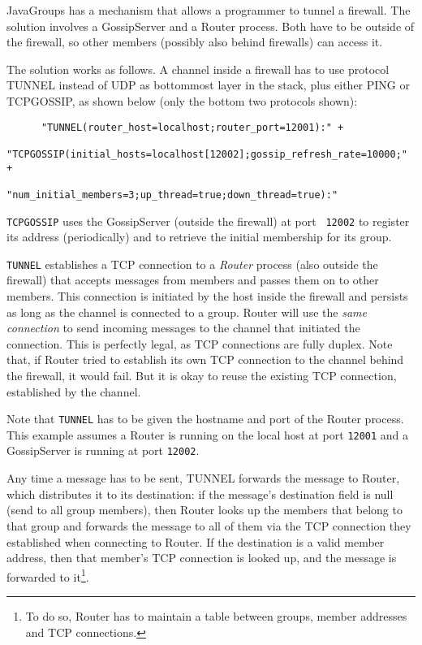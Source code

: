       JavaGroups has a mechanism that allows a programmer to tunnel a firewall. The
      solution involves a GossipServer and a Router process. Both have to be outside
      of the firewall, so other members (possibly also behind firewalls) can access
      it.

      The solution works as follows. A channel inside a firewall has to use protocol
      TUNNEL instead of UDP as bottommost layer in the stack, plus either PING or
      TCPGOSSIP, as shown below (only the bottom two protocols shown):

      \begin{small}
      \begin{verbatim}
      "TUNNEL(router_host=localhost;router_port=12001):" +
      "TCPGOSSIP(initial_hosts=localhost[12002];gossip_refresh_rate=10000;" +
                 "num_initial_members=3;up_thread=true;down_thread=true):"
      \end{verbatim}
      \end{small}
      
      {\tt TCPGOSSIP} uses the GossipServer (outside the firewall) at port {\tt
      12002} to register its address (periodically) and to retrieve the initial
      membership for its group.

      {\tt TUNNEL} establishes a TCP connection to a {\em Router} process (also
      outside the firewall) that accepts messages from members and passes them on to
      other members. This connection is initiated by the host inside the firewall and
      persists as long as the channel is connected to a group. Router will use the
      {\em same connection} to send incoming messages to the channel that initiated
      the connection. This is perfectly legal, as TCP connections are fully
      duplex. Note that, if Router tried to establish its own TCP connection to the
      channel behind the firewall, it would fail. But it is okay to reuse the
      existing TCP connection, established by the channel.

      Note that {\tt TUNNEL} has to be given the hostname and port of the Router
      process. This example assumes a Router is running on the local host at port
      {\tt 12001} and a GossipServer is running at port {\tt 12002}.

      Any time a message has to be sent, TUNNEL forwards the message to Router, which
      distributes it to its destination: if the message's destination field is null
      (send to all group members), then Router looks up the members that belong to
      that group and forwards the message to all of them via the TCP connection they
      established when connecting to Router. If the destination is a valid member
      address, then that member's TCP connection is looked up, and the message is
      forwarded to it\footnote{To do so, Router has to maintain a table between
      groups, member addresses and TCP connections.}.

